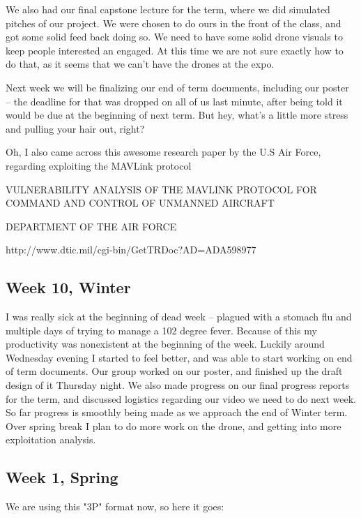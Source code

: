 \documentclass[IEEEtran,letterpaper,10pt,notitlepage,draftclsnofoot,onecolumn]{article}
\begin{document}
                            We also had our final capstone lecture for the term, where we did simulated pitches of our project. We were chosen to do ours in the front of the class, and got some solid feed back doing so. We need to have some solid drone visuals to keep people interested an engaged. At this time we are not sure exactly how to do that, as it seems that we can't have the drones at the expo.

                            Next week we will be finalizing our end of term documents, including our poster -- the deadline for that was dropped on all of us last minute, after being told it would be due at the beginning of next term. But hey, what's a little more stress and pulling your hair out, right?

                            Oh, I also came across this awesome research paper by the U.S Air Force, regarding exploiting the MAVLink protocol

                            VULNERABILITY ANALYSIS OF THE MAVLINK PROTOCOL FOR COMMAND AND CONTROL OF UNMANNED AIRCRAFT

                            DEPARTMENT OF THE AIR FORCE

                            http://www.dtic.mil/cgi-bin/GetTRDoc?AD=ADA598977
                            \subsection{Week 10, Winter}
                            I was really sick at the beginning of dead week -- plagued with a stomach flu and multiple days of trying to manage a 102 degree fever. Because of this my productivity was nonexistent at the beginning of the week. Luckily around Wednesday evening I started to feel better, and was able to start working on end of term documents. Our group worked on our poster, and finished up the draft design of it Thursday night. We also made progress on our final progress reports for the term, and discussed logistics regarding our video we need to do next week. So far progress is smoothly being made as we approach the end of Winter term. Over spring break I plan to do more work on the drone, and getting into more exploitation analysis.
                            \subsection{Week 1, Spring}
                            We are using this "3P" format now, so here it goes:
\end{document}
